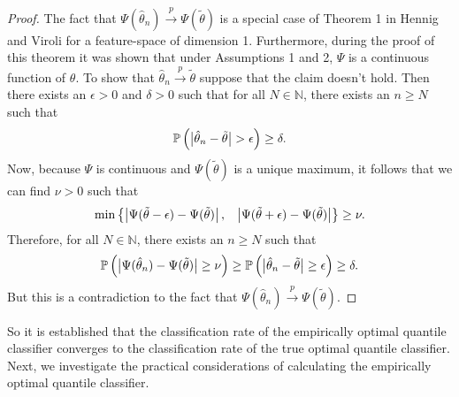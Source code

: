\begin{proof}
  The fact that
  $\Psi(\hat{\theta}_n) \stackrel{p}{\longrightarrow} \Psi(\tilde{\theta})$ is a
  special case of Theorem 1 in Hennig and Viroli for a feature-space of
  dimension 1.  Furthermore, during the proof of this theorem it was shown that
  under Assumptions 1 and 2, $\Psi$ is a continuous function of $\theta$.  To
  show that $\hat{\theta}_n \stackrel{p}{\longrightarrow} \tilde{\theta}$
  suppose that the claim doesn't hold.  Then there exists an $\epsilon > 0$ and
  $\delta > 0$ such that for all $N \in \mathbb{N}$, there exists an $n \geq N$
  such that
  \begin{equation*}
    \mathbb{P}\,\Big(
    \big| \hat{\theta}_n - \tilde{\theta} \big|
    > \epsilon \Big)
    \geq \delta.
  \end{equation*}
  Now, because $\Psi$ is continuous and $\Psi(\tilde{\theta})$ is a unique
  maximum, it follows that we can find $\nu > 0$ such that
  \begin{equation*}
    \min \left\{
      \big| \Psi(\Tilde{\theta} - \epsilon) - \Psi(\tilde{\theta}) \big|\,,
      \hspace{3mm}
      \big| \Psi(\Tilde{\theta} + \epsilon) - \Psi(\tilde{\theta}) \big|
    \right\} \geq \nu.
  \end{equation*}
  Therefore, for all $N \in \mathbb{N}$, there exists an $n \geq N$ such that
  \begin{equation*}
    \mathbb{P}\,\Big(
    \big| \Psi(\hat{\theta}_n) - \Psi(\tilde{\theta}) \big|
    \geq \nu \Big) \geq
    \mathbb{P}\,\Big(
    \big| \hat{\theta}_n - \tilde{\theta} \big|
    \geq \epsilon \Big)
    \geq \delta.
  \end{equation*}
  But this is a contradiction to the fact that
  $\Psi(\hat{\theta}_n) \stackrel{p}{\longrightarrow} \Psi(\tilde{\theta})$.
\end{proof}

So it is established that the classification rate of the empirically optimal
quantile classifier converges to the classification rate of the true optimal
quantile classifier.  Next, we investigate the practical considerations of
calculating the empirically optimal quantile classifier.

